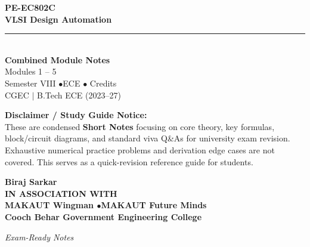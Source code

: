\documentclass[12pt,a4paper]{article}
\begin{document}
\thispagestyle{empty}


\vspace*{1.0cm}
\begin{center}
  {\Huge\bfseries\color{myred} PE-EC802C}\\[10pt]
  {\LARGE\bfseries\color{mydark} VLSI Design Automation}\\[20pt]
  {\color{myred}\rule{0.7\linewidth}{1.5pt}}\\[18pt]
  {\Large\color{myteal}\textbf{Combined Module Notes}}\\[8pt]
  {\large\color{mydark} Modules 1 -- 5}\\[40pt]
  {\normalsize\color{mydark} Semester VIII \quad$\bullet$\quad ECE \quad$\bullet$ Credits}\\[12pt]
  {\normalsize\color{mydark} CGEC \;$|$\; B.Tech ECE (2023--27)}
\end{center}
\vspace{1.0cm}
\begin{center}
  \begin{tcolorbox}[colback=mygray, colframe=mgframe, boxrule=0.5pt, arc=3pt, width=0.85\linewidth]
    \centering\small\color{mydark}
    \textbf{Disclaimer / Study Guide Notice:}\\
    These are condensed \textbf{Short Notes} focusing on core theory, key formulas, block/circuit diagrams, and standard viva Q\&As for university exam revision. Exhaustive numerical practice problems and derivation edge cases are not covered. This serves as a quick-revision reference guide for students.
  \end{tcolorbox}
\end{center}
\vfill
\vspace{0.6cm}
\begin{center}
  {\large\bfseries\color{mypurple} Biraj Sarkar}\\[16pt]
  {\footnotesize\color{watermark}\textbf{IN ASSOCIATION WITH}}\\[8pt]
  {\small\bfseries\color{mydark} MAKAUT Wingman \quad$\bullet$\quad MAKAUT Future Minds}\\[12pt]
  {\large\bfseries\color{myteal} Cooch Behar Government Engineering College}
\end{center}
\vfill
\begin{center}{\small\color{watermark}\textit{Exam-Ready Notes}}\end{center}
\clearpage
\end{document}
